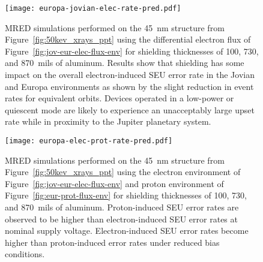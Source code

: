 \begin{figure}[htbp]
    \begin{center}
        \texttt{[image: europa-jovian-elec-rate-pred.pdf]}
    \end{center}
    \caption{MRED simulations performed on the 45~nm structure from Figure~\ref{fig:50kev_xrays_ppt} using the differential electron flux of Figure~\ref{fig:jov-eur-elec-flux-env} for shielding thicknesses of 100, 730, and 870~mils of aluminum. 
    Results show that shielding has some impact on the overall electron-induced SEU error rate in the Jovian and Europa environments as shown by the slight reduction in event rates for equivalent orbits.
    Devices operated in a low-power or quiescent mode are likely to experience an unacceptably large upset rate while in proximity to the Jupiter planetary system.}
    \label{fig:europa-jovian-elec-rate-pred}
\end{figure}

\begin{figure}[htbp]
    \begin{center}
        \texttt{[image: europa-elec-prot-rate-pred.pdf]}
    \end{center}
    \caption{MRED simulations performed on the 45~nm structure from Figure~\ref{fig:50kev_xrays_ppt} using the electron environment of Figure~\ref{fig:jov-eur-elec-flux-env} and proton environment of Figure~\ref{fig:eur-prot-flux-env} for shielding thicknesses of 100, 730, and 870~mils of aluminum.
    Proton-induced SEU error rates are observed to be higher than electron-induced SEU error rates at nominal supply voltage. 
    Electron-induced SEU error rates become higher than proton-induced error rates under reduced bias conditions.
    }
    \label{fig:europa-elec-prot-rate-pred}
\end{figure}

